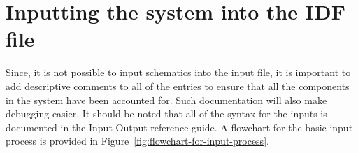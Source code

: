 \chapter{Inputting the system into the IDF file}\label{inputting-the-system-into-the-idf-file}

Since, it is not possible to input schematics into the input file, it is important to add descriptive comments to all of the entries to ensure that all the components in the system have been accounted for. Such documentation will also make debugging easier. It should be noted that all of the syntax for the inputs is documented in the Input-Output reference guide. A flowchart for the basic input process is provided in Figure~\ref{fig:flowchart-for-input-process}.

\begin{figure}[hbtp] %
\centering

\end{figure}
